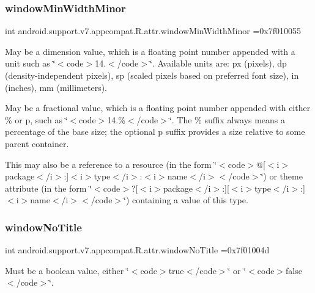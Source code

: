 \subsubsection{\texorpdfstring{window\+Min\+Width\+Minor}{windowMinWidthMinor}}
{\footnotesize\ttfamily int android.\+support.\+v7.\+appcompat.\+R.\+attr.\+window\+Min\+Width\+Minor =0x7f010055\hspace{0.3cm}{\ttfamily [static]}}

May be a dimension value, which is a floating point number appended with a unit such as \char`\"{}$<$code$>$14.\+5sp$<$/code$>$\char`\"{}. Available units are\+: px (pixels), dp (density-\/independent pixels), sp (scaled pixels based on preferred font size), in (inches), mm (millimeters). 

May be a fractional value, which is a floating point number appended with either \% or p, such as \char`\"{}$<$code$>$14.\%$<$/code$>$\char`\"{}. The \% suffix always means a percentage of the base size; the optional p suffix provides a size relative to some parent container. 

This may also be a reference to a resource (in the form \char`\"{}$<$code$>$@\mbox{[}$<$i$>$package$<$/i$>$\+:\mbox{]}$<$i$>$type$<$/i$>$\+:$<$i$>$name$<$/i$>$$<$/code$>$\char`\"{}) or theme attribute (in the form \char`\"{}$<$code$>$?\mbox{[}$<$i$>$package$<$/i$>$\+:\mbox{]}\mbox{[}$<$i$>$type$<$/i$>$\+:\mbox{]}$<$i$>$name$<$/i$>$$<$/code$>$\char`\"{}) containing a value of this type. \mbox{\label{classandroid_1_1support_1_1v7_1_1appcompat_1_1R_1_1attr_a9f5fa98788f7d689538690d3e654a5a8}} 
\subsubsection{\texorpdfstring{window\+No\+Title}{windowNoTitle}}
{\footnotesize\ttfamily int android.\+support.\+v7.\+appcompat.\+R.\+attr.\+window\+No\+Title =0x7f01004d\hspace{0.3cm}{\ttfamily [static]}}

Must be a boolean value, either \char`\"{}$<$code$>$true$<$/code$>$\char`\"{} or \char`\"{}$<$code$>$false$<$/code$>$\char`\"{}. 

